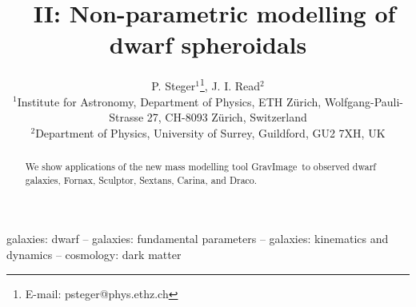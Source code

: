 \documentclass[useAMS,usenatbib]{mn2e}
\title[\GravImage\ II: Mass modelling of dSph]{\GravImage\ II:
  Non-parametric modelling of dwarf spheroidals}
\author[Steger]{P. Steger$^1$\thanks{E-mail: psteger@phys.ethz.ch}, J. I. Read$^{2}$\\
$^1$Institute for Astronomy, Department of Physics, ETH Z\"urich, Wolfgang-Pauli-Strasse 27, CH-8093 Z\"urich, Switzerland\\
$^2$Department of Physics, University of Surrey, Guildford, GU2 7XH, UK
}
\def\GravImage{{\sc GravImage}}
\begin{document}
\maketitle

\begin{abstract}
    We show applications of the new mass modelling tool \GravImage\ to
    observed dwarf galaxies, Fornax, Sculptor, Sextans, Carina, and Draco.
\end{abstract}

\begin{keywords} galaxies: dwarf -- galaxies: fundamental parameters
    -- galaxies: kinematics and dynamics -- cosmology: dark matter
\end{keywords}











\end{document}
